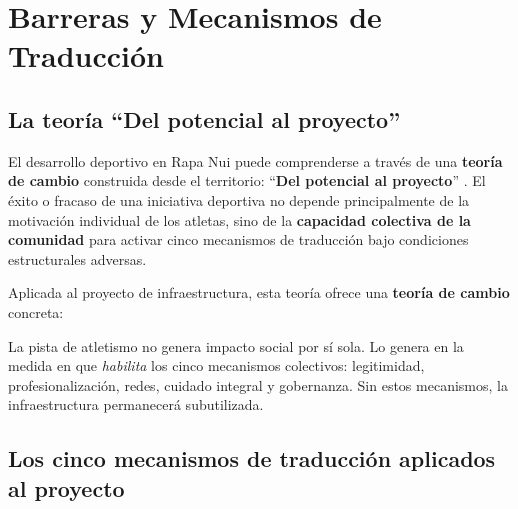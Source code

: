 \documentclass[12pt, a4paper]{article}
\begin{document}
\section{Barreras y Mecanismos de Traducción}

\subsection{La teoría ``Del potencial al proyecto''}

El desarrollo deportivo en Rapa Nui puede comprenderse a través de una
\textbf{teoría de cambio} construida desde el territorio: ``\textbf{Del potencial
al proyecto}'' \citep{ortega2026}. El éxito o fracaso de una iniciativa deportiva
no depende principalmente de la motivación individual de los atletas, sino de la
\textbf{capacidad colectiva de la comunidad} para activar cinco mecanismos de
traducción bajo condiciones estructurales adversas.

Aplicada al proyecto de infraestructura, esta teoría ofrece una \textbf{teoría de
cambio} concreta:

\begin{conceptoclave}
  La pista de atletismo no genera impacto social por sí sola. Lo genera en la medida
  en que \textit{habilita} los cinco mecanismos colectivos: legitimidad, profesionalización,
  redes, cuidado integral y gobernanza. Sin estos mecanismos, la infraestructura
  permanecerá subutilizada.
\end{conceptoclave}

\subsection{Los cinco mecanismos de traducción aplicados al proyecto}
\end{document}
